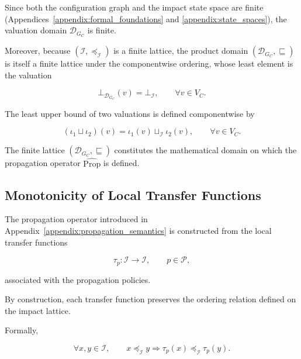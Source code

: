 \documentclass[10pt]{article}
\begin{document}
Since both the configuration graph and the impact state space are finite (Appendices~\ref{appendix:formal_foundations} and
\ref{appendix:state_spaces}), the valuation domain
$\mathcal D_{G_C}$ is finite.

Moreover, because
$\left(\mathcal I,\preceq_{\mathcal I}\right)$
is a finite lattice, the product domain
$\left(\mathcal D_{G_C},\sqsubseteq\right)$
is itself a finite lattice under the componentwise ordering, whose least element is the valuation

\begin{equation}
	\label{eq:bottom_valuation}
	\bot_{\mathcal D_{G_C}}(v)
	=
	\bot_{\mathcal I},
	\qquad
	\forall v\in V_C.
\end{equation}

The least upper bound of two valuations is defined componentwise by

\begin{equation}
	\label{eq:valuation_join}
	(\iota_1
	\sqcup
	\iota_2)(v)
	=
	\iota_1(v)
	\sqcup_{\mathcal I}
	\iota_2(v),
	\qquad
	\forall v\in V_C.
\end{equation}

The finite lattice
$\left(\mathcal D_{G_C},\sqsubseteq\right)$
constitutes the mathematical domain on which the propagation operator
$\widehat{\mathrm{Prop}}$ is defined.

\subsection{Monotonicity of Local Transfer Functions}
\label{appendix:local_monotonicity}
The propagation operator introduced in
Appendix~\ref{appendix:propagation_semantics}
is constructed from the local transfer functions

\[
\tau_p :
\mathcal I
\rightarrow
\mathcal I,
\qquad
p\in\mathcal P,
\]

associated with the propagation policies.

By construction, each transfer function preserves the ordering relation defined on the impact lattice.

Formally,

\begin{equation}
	\label{eq:transfer_monotone}
	\forall
	x,y
	\in
	\mathcal I,
	\qquad
	x
	\preceq_{\mathcal I}
	y
	\Longrightarrow
	\tau_p(x)
	\preceq_{\mathcal I}
	\tau_p(y).
\end{equation}
\end{document}
